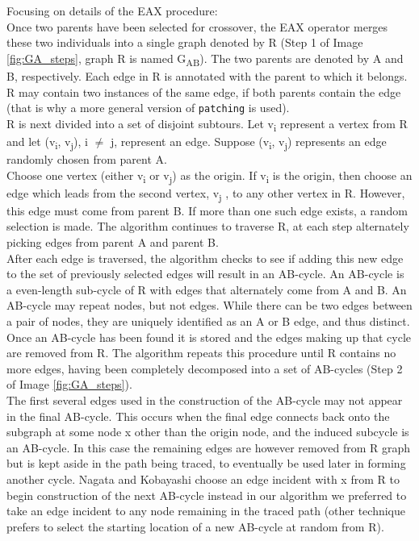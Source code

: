 Focusing on details of the EAX procedure:\\
Once two parents have been selected for crossover, the EAX operator merges these two individuals into a single graph denoted by R (Step 1 of Image \ref{fig:GA_steps}, graph R is named G\textsubscript{AB}). The two parents are denoted by A and B, respectively. Each edge in R is annotated with the parent to which it belongs. R may contain two instances of the same edge, if both parents contain the edge (that is why a more general version of \texttt{patching} is used).\\
R is next divided into a set of disjoint subtours. Let v\textsubscript{i} represent a vertex from R and let (v\textsubscript{i},  v\textsubscript{j}), i $\neq$ j, represent an edge. Suppose (v\textsubscript{i},  v\textsubscript{j}) represents an edge randomly chosen from parent A.\\
Choose one vertex (either v\textsubscript{i} or v\textsubscript{j}) as the origin. If v\textsubscript{i} is the origin, then choose an edge which leads from the second vertex, v\textsubscript{j} , to any other vertex in R. However, this edge must come from parent B. If more than one such edge exists, a random selection is made. The algorithm continues to traverse R, at each step alternately picking edges from parent A and parent B.\\
After each edge is traversed, the algorithm checks to see if adding this new edge to the set of previously selected edges will result in an AB-cycle. An AB-cycle is a even-length sub-cycle of R with edges that alternately come from A and B. An AB-cycle may repeat nodes, but not edges. While there can be two edges between a pair of nodes, they are uniquely identified as an A or B edge, and thus distinct.\\
Once an AB-cycle has been found it is stored and the edges making up that cycle are removed from R. The algorithm repeats this procedure until R contains no more edges, having been completely decomposed into a set of AB-cycles (Step 2 of Image \ref{fig:GA_steps}). \\
The first several edges used in the construction of the AB-cycle may not appear in the final AB-cycle.
This occurs when the final edge connects back onto the subgraph at some node x other than the origin node, and the induced subcycle is an AB-cycle. In this case the remaining edges are however removed from R graph but is kept aside in the path being traced, to eventually be used later in forming another cycle. Nagata and Kobayashi choose an edge incident with x from R to begin construction of the next AB-cycle instead in our algorithm we preferred to take an edge incident to any node remaining in the traced path (other technique prefers to select the starting location of a new AB-cycle at random from R).

